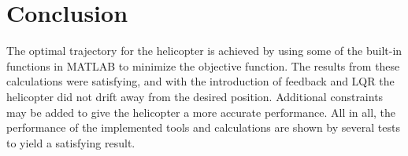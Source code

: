 \section{Conclusion}\label{sec:conclusion}
The optimal trajectory for the helicopter is achieved by using some of the built-in functions in MATLAB to minimize the objective function. The results from these calculations were satisfying, and with the introduction of feedback and LQR the helicopter did not drift away from the desired position. Additional constraints may be added to give the helicopter a more accurate performance. All in all, the performance of the implemented tools and calculations are shown by several tests to yield a satisfying result.